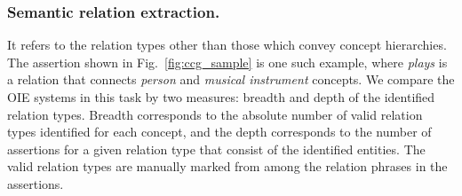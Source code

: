 \documentclass{llncs}
\begin{document}
\subsubsection{Semantic relation extraction.} It refers to the relation types other than those which convey concept hierarchies. The assertion shown in Fig.~\ref{fig:ccg_sample} is one such example, where \textit{plays} is a relation that connects \textit{person} and \textit{musical instrument} concepts. We compare the OIE systems in this task by two measures: breadth and depth of the identified relation types. Breadth corresponds to the absolute number of valid relation types identified for each concept, and the depth corresponds to the number of assertions for a given relation type that consist of the identified entities. The valid relation types are manually marked from among the relation phrases in the assertions.
\end{document}

